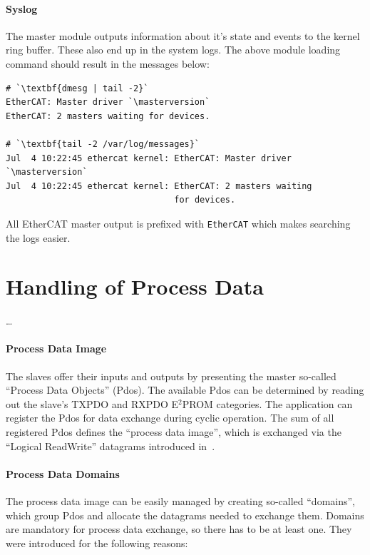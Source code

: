 \documentclass[a4paper,12pt,BCOR6mm,bibtotoc,idxtotoc]{scrbook}
\newcommand{\masterversion}{1.4.0}
\begin{document}
\paragraph{Syslog}

The master module outputs information about it's state and events to the
kernel ring buffer. These also end up in the system logs.  The above module
loading command should result in the messages below:

\begin{lstlisting}
# `\textbf{dmesg | tail -2}`
EtherCAT: Master driver `\masterversion`
EtherCAT: 2 masters waiting for devices.

# `\textbf{tail -2 /var/log/messages}`
Jul  4 10:22:45 ethercat kernel: EtherCAT: Master driver `\masterversion`
Jul  4 10:22:45 ethercat kernel: EtherCAT: 2 masters waiting
                                 for devices.
\end{lstlisting}

All EtherCAT master output is prefixed with \lstinline+EtherCAT+ which makes
searching the logs easier.


\section{Handling of Process Data} %
\label{sec:processdata}

\ldots

\paragraph{Process Data Image}

The slaves offer their inputs and outputs by presenting the master so-called
``Process Data Objects'' (Pdos). The available Pdos can be
determined by reading out the slave's TXPDO and RXPDO E$^2$PROM categories. The
application can register the Pdos for data exchange during cyclic operation.
The sum of all registered Pdos defines the ``process data image'', which is
exchanged via the ``Logical ReadWrite'' datagrams introduced
in~\cite[section~5.4.2.4]{dlspec}.

\paragraph{Process Data Domains}

The process data image can be easily managed by creating so-called
``domains'', which group Pdos and allocate the datagrams needed to
exchange them. Domains are mandatory for process data exchange, so
there has to be at least one. They were introduced for the following
reasons:
\end{document}
